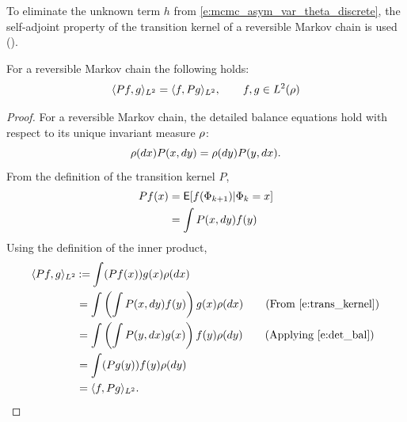 To eliminate the unknown term $h$ from \eqref{e:mcmc_asym_var_theta_discrete}, the self-adjoint property of the transition kernel of a reversible Markov chain is used ().
\begin{proposition}
	\label{theorem:self_adjoint}
	For a reversible Markov chain the following holds:
	\[
	\langle P f , g \rangle_{L^2}= \langle f, P g \rangle_{L^2}, \qquad f,g \in L^2(\rho)
	\]
\end{proposition}
\begin{proof}
	For a reversible Markov chain, the detailed balance equations hold with respect to its unique invariant measure $\rho$:
	\begin{equation}
	\pr(dx) P(x,dy ) = \pr(dy) P(y,dx).
	\label{e:det_bal}
	\end{equation}
	From the definition of the transition kernel $P$,
	\begin{equation}
	\begin{aligned}
	P f (x) & = \Expect [f(\markovstate_{k+1}) | \markovstate_k = x] \\
	& = \int P(x,dy) f(y)
	\label{e:trans_kernel}
	\end{aligned}
	\end{equation}
	Using the definition of the inner product,
	\[
	\begin{aligned}
	\langle P f, g \rangle_{L^2} & \mathbin{:=} \int (Pf(x)) g(x) \rho(dx) \\
	& = \int \left(\int P(x,dy)f(y)\right) g(x) \rho(dx)  \qquad (\text{From } \eqref{e:trans_kernel}) \\
	& = \int \left(\int P(y,dx) g(x) \right) f(y) \rho(dy) \qquad (\text {Applying } \eqref{e:det_bal})\\
	& = \int (P g(y)) f(y) \rho(dy) \\
	& = \langle f, P g \rangle_{L^2}.
	\end{aligned}
	\]
\end{proof}

